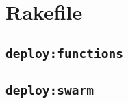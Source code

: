 \appendix
\appendixpage

\section{Rakefile}

\subsection{\texttt{deploy:functions}}


\newpage
\subsection{\texttt{deploy:swarm}}

